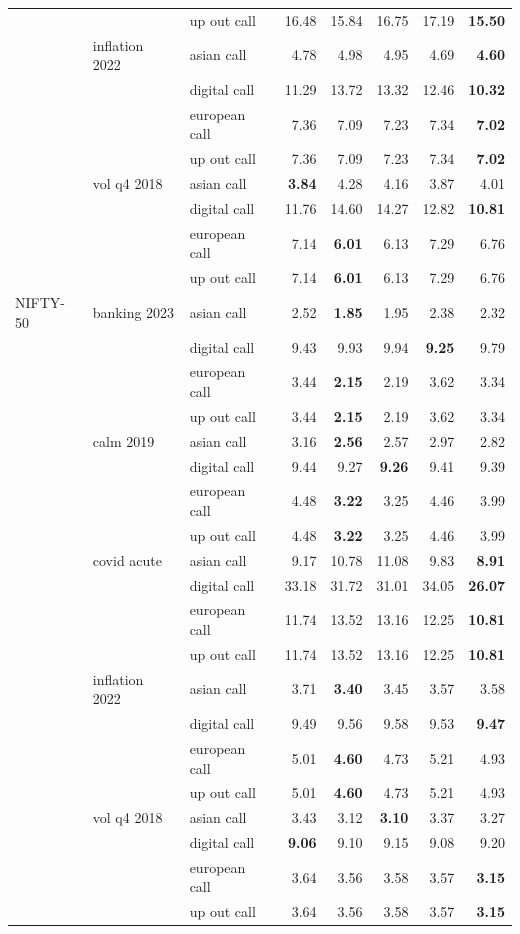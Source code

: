 \documentclass[11pt,oneside]{report}
\begin{document}
{\begin{longtable}{@{}p{1.3cm}p{1.7cm}p{1.6cm}rrrrr@{}}
 &  & up out call & 16.48 & 15.84 & 16.75 & 17.19 & \textbf{15.50} \\
 & inflation 2022 & asian call & 4.78 & 4.98 & 4.95 & 4.69 & \textbf{4.60} \\
 &  & digital call & 11.29 & 13.72 & 13.32 & 12.46 & \textbf{10.32} \\
 &  & european call & 7.36 & 7.09 & 7.23 & 7.34 & \textbf{7.02} \\
 &  & up out call & 7.36 & 7.09 & 7.23 & 7.34 & \textbf{7.02} \\
 & vol q4 2018 & asian call & \textbf{3.84} & 4.28 & 4.16 & 3.87 & 4.01 \\
 &  & digital call & 11.76 & 14.60 & 14.27 & 12.82 & \textbf{10.81} \\
 &  & european call & 7.14 & \textbf{6.01} & 6.13 & 7.29 & 6.76 \\
 &  & up out call & 7.14 & \textbf{6.01} & 6.13 & 7.29 & 6.76 \\
\midrule
NIFTY-50 & banking 2023 & asian call & 2.52 & \textbf{1.85} & 1.95 & 2.38 & 2.32 \\
 &  & digital call & 9.43 & 9.93 & 9.94 & \textbf{9.25} & 9.79 \\
 &  & european call & 3.44 & \textbf{2.15} & 2.19 & 3.62 & 3.34 \\
 &  & up out call & 3.44 & \textbf{2.15} & 2.19 & 3.62 & 3.34 \\
 & calm 2019 & asian call & 3.16 & \textbf{2.56} & 2.57 & 2.97 & 2.82 \\
 &  & digital call & 9.44 & 9.27 & \textbf{9.26} & 9.41 & 9.39 \\
 &  & european call & 4.48 & \textbf{3.22} & 3.25 & 4.46 & 3.99 \\
 &  & up out call & 4.48 & \textbf{3.22} & 3.25 & 4.46 & 3.99 \\
 & covid acute & asian call & 9.17 & 10.78 & 11.08 & 9.83 & \textbf{8.91} \\
 &  & digital call & 33.18 & 31.72 & 31.01 & 34.05 & \textbf{26.07} \\
 &  & european call & 11.74 & 13.52 & 13.16 & 12.25 & \textbf{10.81} \\
 &  & up out call & 11.74 & 13.52 & 13.16 & 12.25 & \textbf{10.81} \\
 & inflation 2022 & asian call & 3.71 & \textbf{3.40} & 3.45 & 3.57 & 3.58 \\
 &  & digital call & 9.49 & 9.56 & 9.58 & 9.53 & \textbf{9.47} \\
 &  & european call & 5.01 & \textbf{4.60} & 4.73 & 5.21 & 4.93 \\
 &  & up out call & 5.01 & \textbf{4.60} & 4.73 & 5.21 & 4.93 \\
 & vol q4 2018 & asian call & 3.43 & 3.12 & \textbf{3.10} & 3.37 & 3.27 \\
 &  & digital call & \textbf{9.06} & 9.10 & 9.15 & 9.08 & 9.20 \\
 &  & european call & 3.64 & 3.56 & 3.58 & 3.57 & \textbf{3.15} \\
 &  & up out call & 3.64 & 3.56 & 3.58 & 3.57 & \textbf{3.15} \\
\end{longtable}
}
\end{document}
